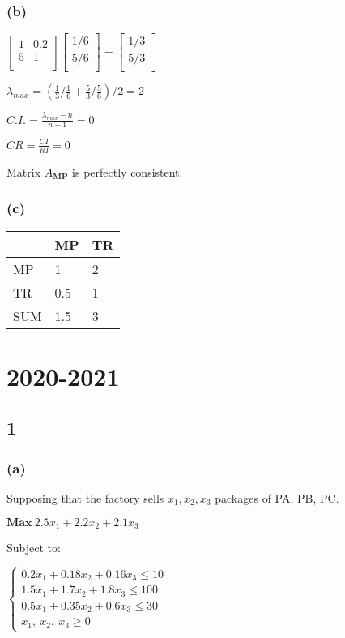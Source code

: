 \documentclass{article}
\begin{document}
\subsubsection*{(b)}
$\begin{bmatrix}
1 & 0.2 \\
5 & 1 \\
\end{bmatrix}\begin{bmatrix}
1/6\\
5/6\\
\end{bmatrix}=\begin{bmatrix}
1/3\\
5/3\\
\end{bmatrix}$\par\indent
\par
$\lambda_{max}=(\frac{1}{3}/\frac{1}{6}+\frac{5}{3}/\frac{5}{6})/2=2$\par
$C.I.=\frac{\lambda_{max}-n}{n-1}=0$\par
$CR=\frac{CI}{RI}=0$\par
Matrix $A_{\textbf{MP}}$ is perfectly consistent.

\subsubsection*{(c)}
\begin{tabular}{|l|l|l|}
\hline
    & MP & TR  \\ \hline
MP  & 1  & 2 \\ \hline
TR  & 0.5  & 1   \\ \hline
SUM & 1.5  & 3 \\ \hline
\end{tabular}\par\indent
\par\indent
\par





\section*{2020-2021}
\subsection*{1}
\subsubsection*{(a)}
Supposing that the factory sells $x_{1},x_{2},x_{3}$ packages of PA, PB, PC.\par
$\textbf{Max} \  2.5x_{1}+2.2x_{2}+2.1x_{3}$\par
Subject to:\par\indent
\par
$\begin{cases}
0.2x_{1}+0.18x_{2}+0.16x_{3} \leq 10\\
1.5x_{1}+1.7x_{2}+1.8x_{3} \leq 100\\
0.5x_{1}+0.35x_{2}+0.6x_{3} \leq 30\\
x_{1}, \ x_{2}, \ x_{3} \geq 0\end{cases}$
\end{document}
